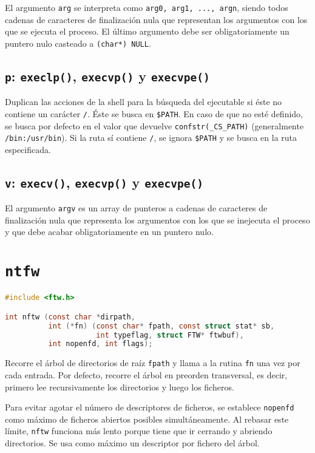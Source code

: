 El argumento \texttt{arg} se interpreta como \texttt{arg0, arg1, ..., argn}, siendo todos cadenas de caracteres de finalización nula que representan los argumentos con los que se ejecuta el proceso.
El último argumento debe ser obligatoriamente un puntero nulo casteado a \texttt{(char*) NULL}.

\subsection{\texttt{p}: \texttt{execlp()}, \texttt{execvp()} y \texttt{execvpe()}}

Duplican las acciones de la shell para la búsqueda del ejecutable si éste no contiene un carácter \texttt{/}.
Éste se busca en \texttt{\$PATH}.
En caso de que no esté definido, se busca por defecto en el valor que devuelve \texttt{confstr(\_CS\_PATH)} (generalmente \texttt{/bin:/usr/bin}).
Si la ruta sí contiene \texttt{/}, se ignora \texttt{\$PATH} y se busca en la ruta especificada.

\subsection{\texttt{v}: \texttt{execv()}, \texttt{execvp()} y \texttt{execvpe()}}

El argumento \texttt{argv} es un array de punteros a cadenas de caracteres de finalización nula que representa los argumentos con los que se inejecuta el proceso y que debe acabar obligatoriamente en un puntero nulo.

\section{\texttt{ntfw}}\label{ntfw}

\begin{lstlisting}[language=C]
#include <ftw.h>

int nftw (const char *dirpath,
          int (*fn) (const char* fpath, const struct stat* sb,
                     int typeflag, struct FTW* ftwbuf),
          int nopenfd, int flags);
\end{lstlisting}

Recorre el árbol de directorios de raíz \texttt{fpath} y llama a la rutina \texttt{fn} una vez por cada entrada.
Por defecto, recorre el árbol en preorden transversal, es decir, primero lee recursivamente los directorios y luego los ficheros.

Para evitar agotar el número de descriptores de ficheros, se establece \texttt{nopenfd} como máximo de ficheros abiertos posibles simultáneamente.
Al rebasar este límite, \texttt{nftw} funciona más lento porque tiene que ir cerrando y abriendo directorios.
Se usa como máximo un descriptor por fichero del árbol.

